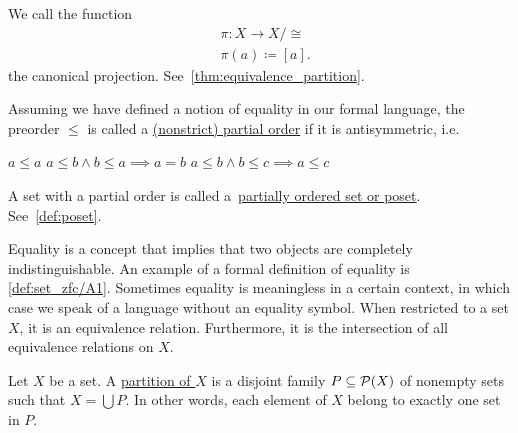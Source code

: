 \begin{definition}
\begin{defenum}
    We call the function
    \begin{align*}
      &\pi: X \to X / \cong \\
      &\pi(a) \coloneqq [a].
    \end{align*}
    the canonical projection. See~\cref{thm:equivalence_partition}.

    \item\label{def:order/partial} Assuming we have defined a notion of equality in our formal language, the preorder $\leq$ is called a \ul{(nonstrict) partial order} if it is antisymmetric, i.e.
    \begin{description}
       $a \leq a$
       $a \leq b \land b \leq a \implies a = b$
       $a \leq b \land b \leq c \implies a \leq c$
    \end{description}

    A set with a partial order is called a~\ul{partially ordered set or poset}. See~\cref{def:poset}.
  \end{defenum}
\end{definition}

\begin{note}\label{note:equality_equivalence_relation}
  Equality is a concept that implies that two objects are completely indistinguishable. An example of a formal definition of equality is \cref{def:set_zfc/A1}. Sometimes equality is meaningless in a certain context, in which case we speak of a language without an equality symbol. When restricted to a set $X$, it is an equivalence relation. Furthermore, it is the intersection of all equivalence relations on $X$.
\end{note}

\begin{definition}\label{def:set_partition}
  Let $X$ be a set. A \ul{partition of $X$} is a disjoint family $P \subseteq \operatorname{\mathcal P}(X)$ of nonempty sets such that $X = \bigcup P$. In other words, each element of $X$ belong to exactly one set in $P$.
\end{definition}

